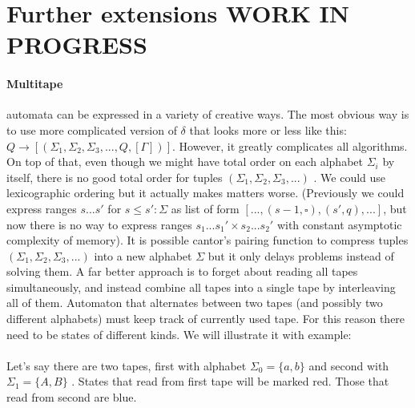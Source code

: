 \documentclass[12pt]{article}
\begin{document}
\section{Further extensions WORK IN PROGRESS}

\paragraph{Multitape} automata can be expressed in a variety of creative ways. The most obvious way is to use more complicated version of $\delta$ that looks more or less like this: $Q \rightarrow [ (\Sigma_1 ,  \Sigma_2 ,  \Sigma_3 , ... , Q , [ \Gamma ])]$. However, it greatly complicates all algorithms. On top of that, even though we might have total order on each alphabet $\Sigma_i$ by itself, there is no good total order for tuples $(\Sigma_1 ,  \Sigma_2 ,  \Sigma_3 , ... )$ . We could use lexicographic ordering but it actually makes matters worse. (Previously we could express ranges $s ... s'$ for $s\le s':\Sigma$ as list of form $[ ...,(s-1,\square),(s',q), ...]$, but now there is no way to express ranges $s_1...s_1' \times s_2...s_2'$ with constant asymptotic complexity of memory). It is possible cantor's pairing function to compress tuples $(\Sigma_1 ,  \Sigma_2 ,  \Sigma_3 , ...) $ into a new alphabet $\Sigma$ but it only delays problems instead of solving them. A far better approach is to forget about reading all tapes simultaneously, and instead combine all tapes into a single tape by interleaving all of them. Automaton that alternates between two tapes (and possibly two different alphabets) must keep track of currently used tape. For this reason there need to be  states of different kinds. We will illustrate it with example: \\
\\
Let's say there are two tapes, first with alphabet $\Sigma_0=\{ a , b\}$ and second with  $\Sigma_1=\{A,B\}$ . States that read from first tape will be marked red. Those that read from second are blue.
\end{document}
